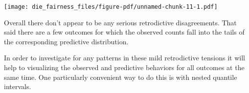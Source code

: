 \documentclass[
  letterpaper,
  DIV=11,
  numbers=noendperiod]{scrartcl}
\newenvironment{Shaded}{\begin{snugshade}}{\end{snugshade}}
\newcommand{\AttributeTok}[1]{\textcolor[rgb]{0.40,0.45,0.13}{#1}}
\newcommand{\ControlFlowTok}[1]{\textcolor[rgb]{0.00,0.23,0.31}{#1}}
\newcommand{\DecValTok}[1]{\textcolor[rgb]{0.68,0.00,0.00}{#1}}
\newcommand{\FunctionTok}[1]{\textcolor[rgb]{0.28,0.35,0.67}{#1}}
\newcommand{\NormalTok}[1]{\textcolor[rgb]{0.00,0.23,0.31}{#1}}
\newcommand{\OtherTok}[1]{\textcolor[rgb]{0.00,0.23,0.31}{#1}}
\newcommand{\SpecialCharTok}[1]{\textcolor[rgb]{0.37,0.37,0.37}{#1}}
\newcommand{\StringTok}[1]{\textcolor[rgb]{0.13,0.47,0.30}{#1}}
\begin{document}
\begin{Shaded}
\end{Shaded}

\texttt{[image: die\_fairness\_files/figure-pdf/unnamed-chunk-11-1.pdf]}

Overall there don't appear to be any serious retrodictive disagreements.
That said there are a few outcomes for which the observed counts fall
into the tails of the corresponding predictive distribution.

In order to investigate for any patterns in these mild retrodictive
tensions it will help to visualizing the observed and predictive
behaviors for all outcomes at the same time. One particularly convenient
way to do this is with nested quantile intervals.
\end{document}
